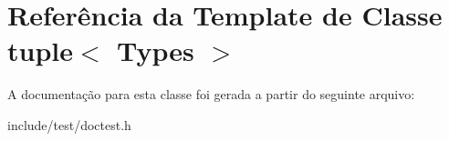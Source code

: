 \hypertarget{classtuple}{}\section{Referência da Template de Classe tuple$<$ Types $>$}
\label{classtuple}


A documentação para esta classe foi gerada a partir do seguinte arquivo\+:\begin{DoxyCompactItemize}
\item 
include/test/doctest.\+h\end{DoxyCompactItemize}
